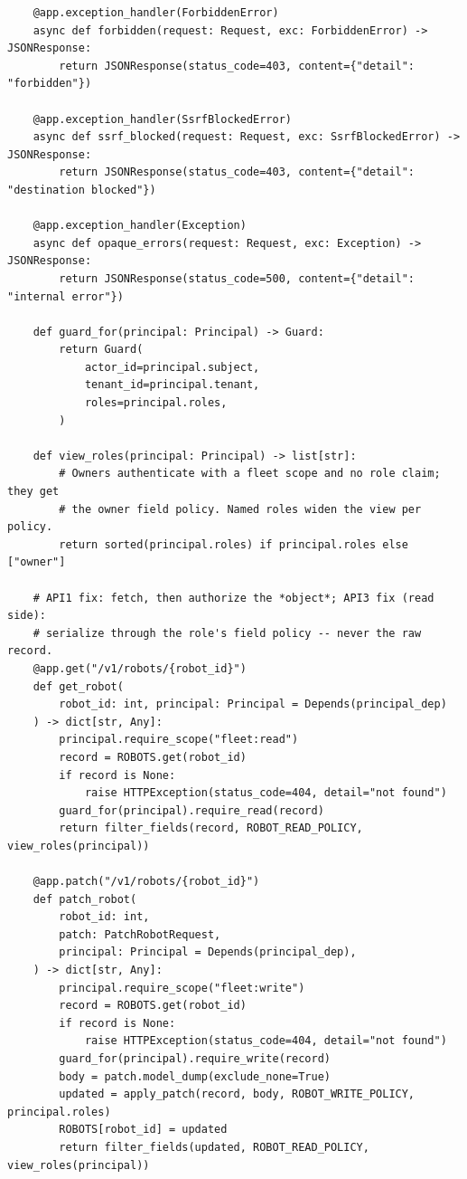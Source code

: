 \begin{verbatim}
    @app.exception_handler(ForbiddenError)
    async def forbidden(request: Request, exc: ForbiddenError) -> JSONResponse:
        return JSONResponse(status_code=403, content={"detail": "forbidden"})

    @app.exception_handler(SsrfBlockedError)
    async def ssrf_blocked(request: Request, exc: SsrfBlockedError) -> JSONResponse:
        return JSONResponse(status_code=403, content={"detail": "destination blocked"})

    @app.exception_handler(Exception)
    async def opaque_errors(request: Request, exc: Exception) -> JSONResponse:
        return JSONResponse(status_code=500, content={"detail": "internal error"})

    def guard_for(principal: Principal) -> Guard:
        return Guard(
            actor_id=principal.subject,
            tenant_id=principal.tenant,
            roles=principal.roles,
        )

    def view_roles(principal: Principal) -> list[str]:
        # Owners authenticate with a fleet scope and no role claim; they get
        # the owner field policy. Named roles widen the view per policy.
        return sorted(principal.roles) if principal.roles else ["owner"]

    # API1 fix: fetch, then authorize the *object*; API3 fix (read side):
    # serialize through the role's field policy -- never the raw record.
    @app.get("/v1/robots/{robot_id}")
    def get_robot(
        robot_id: int, principal: Principal = Depends(principal_dep)
    ) -> dict[str, Any]:
        principal.require_scope("fleet:read")
        record = ROBOTS.get(robot_id)
        if record is None:
            raise HTTPException(status_code=404, detail="not found")
        guard_for(principal).require_read(record)
        return filter_fields(record, ROBOT_READ_POLICY, view_roles(principal))

    @app.patch("/v1/robots/{robot_id}")
    def patch_robot(
        robot_id: int,
        patch: PatchRobotRequest,
        principal: Principal = Depends(principal_dep),
    ) -> dict[str, Any]:
        principal.require_scope("fleet:write")
        record = ROBOTS.get(robot_id)
        if record is None:
            raise HTTPException(status_code=404, detail="not found")
        guard_for(principal).require_write(record)
        body = patch.model_dump(exclude_none=True)
        updated = apply_patch(record, body, ROBOT_WRITE_POLICY, principal.roles)
        ROBOTS[robot_id] = updated
        return filter_fields(updated, ROBOT_READ_POLICY, view_roles(principal))


\end{verbatim}
